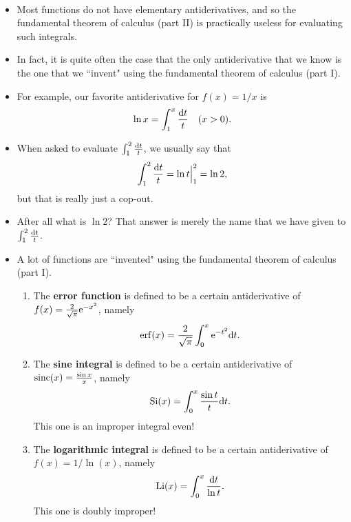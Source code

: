 

\begin{remark}\,
\begin{itemize}
\item 
Most functions do not have elementary antiderivatives, and so the fundamental theorem of calculus (part II) is practically useless for evaluating such integrals.
\item In fact, it is quite often the case that the only antiderivative that we know is the one that we ``invent" using the fundamental theorem of calculus (part I).
\item For example, our favorite antiderivative for $f(x)=1/x$ is 
\begin{equation*}
\ln x = \int_1^x\frac{\mathrm{d} t}{t} \quad (x>0).
\end{equation*}
\item When asked to evaluate $\int_1^2\frac{\mathrm{d} t}{t}$, we usually say that
\begin{equation*}
\int_1^2\frac{\mathrm{d} t}{t} = \ln t\Big|_1^2 = \ln 2,
\end{equation*}
but that is really just a cop-out. 
\item After all what is $\ln 2$?  That answer is merely the name that we have given to $\int_1^2\frac{\mathrm{d} t}{t}$.
\item A lot of functions are ``invented" using the fundamental theorem of calculus (part I).
\begin{enumerate}
\item The \textbf{error function} is defined to be a certain antiderivative of $f(x) = \frac{2}{\sqrt\pi}\mathrm{e}^{-x^2}$, namely
\begin{equation*}
\operatorname{erf} (x) = \frac{2}{\sqrt\pi}\int_0^x\mathrm{e}^{-t^2}\mathrm{d} t.
\end{equation*}
\item The \textbf{sine integral} is defined to be a certain antiderivative of $\operatorname{sinc}(x) = \frac{\sin x}{x}$, namely
\begin{equation*}
\operatorname{Si}(x) = \int_0^x\frac{\sin t}{t}\mathrm{d} t.
\end{equation*}
This one is an improper integral even!
\item The \textbf{logarithmic integral} is defined to be a certain antiderivative of $f(x) = 1/\ln (x)$, namely
\begin{equation*}
\operatorname{Li}(x) = \int_0^x\frac{\mathrm{d} t}{\ln t}.
\end{equation*}
This one is doubly improper!
\end{enumerate}
\end{itemize}
\end{remark}


